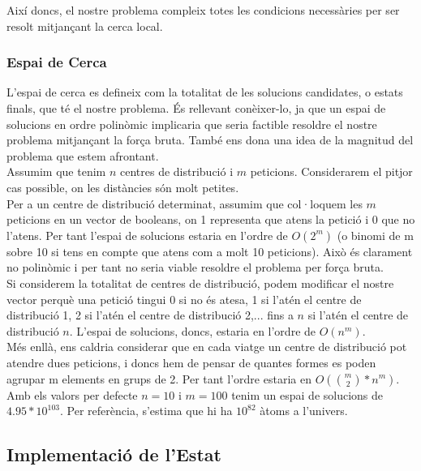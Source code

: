 \documentclass[a4paper]{article}
\begin{document}
Així doncs, el nostre problema compleix totes les condicions necessàries per ser resolt mitjançant la cerca local.

\subsubsection{Espai de Cerca}
L'espai de cerca es defineix com la totalitat de les solucions candidates, o estats finals, que té el nostre problema. És rellevant conèixer-lo, ja que un espai de solucions en ordre polinòmic implicaria que seria factible resoldre el nostre problema mitjançant la força bruta. També ens dona una idea de la magnitud del problema que estem afrontant.\\

Assumim que tenim $n$ centres de distribució i $m$ peticions. Considerarem el pitjor cas possible, on les distàncies són molt petites.\\

Per a un centre de distribució determinat, assumim que col·loquem les $m$ peticions en un vector de booleans, on 1 representa que atens la petició i 0 que no l'atens. Per tant l'espai de solucions estaria en l'ordre de $O(2^m)$ (o binomi de m sobre 10 si tens en compte que atens com a molt 10 peticions). Això és clarament no polinòmic i per tant no seria viable resoldre el problema per força bruta.\\

Si considerem la totalitat de centres de distribució, podem modificar el nostre vector perquè una petició tingui 0 si no és atesa, 1 si l'atén el centre de distribució 1, 2 si l'atén el centre de distribució 2,... fins a $n$ si l'atén el centre de distribució $n$. L'espai de solucions, doncs, estaria en l'ordre de $O(n^m)$.\\

Més enllà, ens caldria considerar que en cada viatge un centre de distribució pot atendre dues peticions, i doncs hem de pensar de quantes formes es poden agrupar m elements en grups de 2. Per tant l'ordre estaria en $O(\binom{m}{2} * n^m)$.\\

Amb els valors per defecte $n = 10$ i $m = 100$ tenim un espai de solucions de $4.95*10^{103}$. Per referència, s'estima que hi ha $10^{82}$ àtoms a l'univers.\\

\subsection{Implementació de l'Estat}
\end{document}
